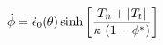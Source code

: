 \documentclass[12pt]{article}
\newcommand{\rbrkt}[1]{\left(#1\right)}
\newcommand{\sbrkt}[1]{\left[#1\right]}
\newcommand{\farg}[1]{\hspace{-0.2em}\rbrkt{#1}}
\begin{document}
                                                                                
\pagestyle{empty}
\begin{Huge}

\[
\dot{\phi} = \dot{\epsilon}_0 \farg{\theta} 
\sinh\sbrkt{\frac{T_n + \left| T_t \right|}{\kappa\,\rbrkt{1 - \phi^*}}}
\]

\end{Huge}
\end{document}

